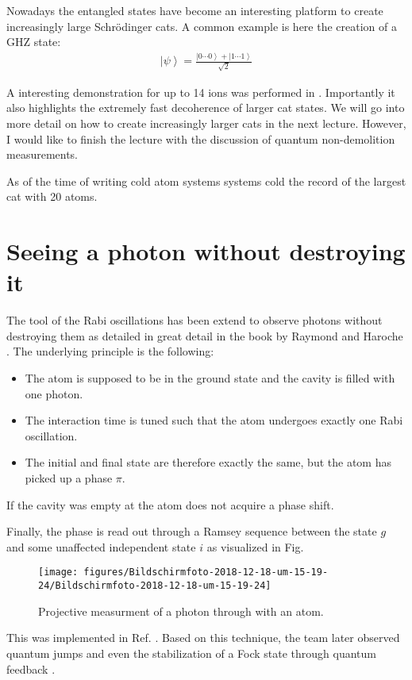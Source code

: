 \documentclass[10pt]{article}
\let\cite\citep
\providecommand\citep{\cite}
\newcommand{\ket}[1]{\ensuremath{\left|#1\right\rangle}}
\begin{document}
Nowadays the entangled states have become an interesting platform  to create increasingly large Schrödinger cats. A common example is here the creation of a GHZ state:
\begin{align}
\ket{\psi} = \frac{\ket{0 \cdots 0}+ \ket{1\cdots 1}}{\sqrt{2}}
\end{align}

A interesting demonstration for up to 14 ions was performed in \cite{Monz_2011}. Importantly it also highlights the extremely fast decoherence of larger cat states. We will  go into more detail on how to create increasingly larger cats in the next lecture. However, I would like to finish the lecture with the discussion of quantum non-demolition measurements.

As of the time of writing cold atom systems systems
\cite{Omran_2019} cold the record of the largest cat with 20 atoms.

\section{Seeing a photon without destroying it}

The tool of the Rabi oscillations has been extend to observe photons without destroying them as detailed in great detail in the book by Raymond and Haroche \cite{quantum}. The underlying principle is the following:
\begin{itemize}
\item The atom is supposed to be in the ground state and the cavity is filled with one photon.
\item The interaction time is tuned such that the atom undergoes exactly one Rabi oscillation.
\item The initial and final state are therefore exactly the same, but the atom has picked up a phase $\pi$.
\end{itemize}
If the cavity was empty at the atom does not acquire a phase shift.

Finally, the phase is read out through a Ramsey sequence between the state $g$ and some unaffected independent state $i$ as visualized in Fig.
\begin{figure}[h!]
\begin{center}
\texttt{[image: figures/Bildschirmfoto-2018-12-18-um-15-19-24/Bildschirmfoto-2018-12-18-um-15-19-24]}
\caption{{Projective measurment of a photon through with an atom.
{\label{338314}}%
}}
\end{center}
\end{figure}

This was implemented in Ref. \cite{Nogues_1999}. Based on this technique, the team later observed quantum jumps \cite{Gleyzes_2007} and even the stabilization of a Fock state through quantum feedback \cite{Sayrin_2011}.

\FloatBarrier


\end{document}
